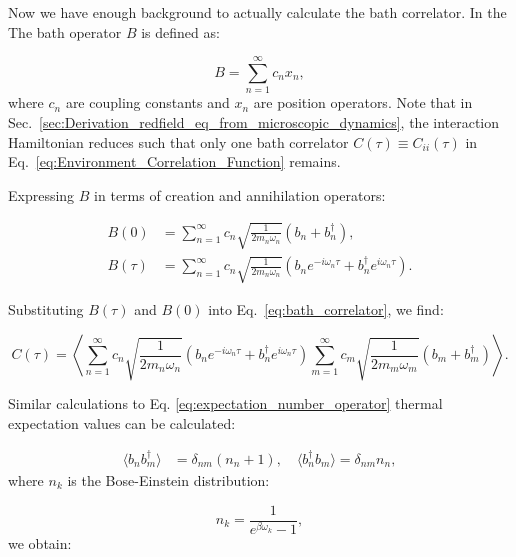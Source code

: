 Now we have enough background to actually calculate the bath correlator.
In the The bath operator \( B \) is defined as:

\begin{equation} \label{eq:bath_operator}
	B = \sum_{n=1}^{\infty} c_n x_n,
\end{equation}
where \( c_n \) are coupling constants and \( x_n \) are position operators. Note that in Sec.~\ref{sec:Derivation_redfield_eq_from_microscopic_dynamics}, the interaction Hamiltonian reduces such that only one bath correlator \( C(\tau) \equiv C_{ii}(\tau) \) in Eq.~\eqref{eq:Environment_Correlation_Function} remains.

Expressing \( B \) in terms of creation and annihilation operators:

\begin{align}
	B(0)    & = \sum_{n=1}^{\infty} c_n \sqrt{\frac{1}{2 m_n \omega_n}} (b_n + b_n^\dagger), \label{eq:bath_operator_t0}                                                        \\
	B(\tau) & = \sum_{n=1}^{\infty} c_n \sqrt{\frac{1}{2 m_n \omega_n}} \left( b_n e^{-i \omega_n \tau} + b_n^\dagger e^{i \omega_n \tau} \right). \label{eq:bath_operator_tau}
\end{align}

Substituting \( B(\tau) \) and \( B(0) \) into Eq.~\eqref{eq:bath_correlator}, we find:

\begin{equation} \label{eq:correlator_substitution}
	C(\tau) = \left\langle \sum_{n=1}^{\infty} c_n \sqrt{\frac{1}{2 m_n \omega_n}} (b_n e^{-i \omega_n \tau} + b_n^\dagger e^{i \omega_n \tau}) \sum_{m=1}^{\infty} c_m \sqrt{\frac{1}{2 m_m \omega_m}} (b_m + b_m^\dagger) \right\rangle.
\end{equation}

Similar calculations to Eq. \eqref{eq:expectation_number_operator} thermal expectation values can be calculated:

\begin{align} \label{eq:thermal_expectations}
	\langle b_n b_m^\dagger \rangle & = \delta_{nm} (n_n + 1), \quad \langle b_n^\dagger b_m \rangle = \delta_{nm} n_n,
\end{align}
where \( n_k \) is the Bose-Einstein distribution:

\begin{equation} \label{eq:bose_einstein_distribution}
	n_k = \frac{1}{e^{\beta \omega_k} - 1},
\end{equation}
we obtain:

